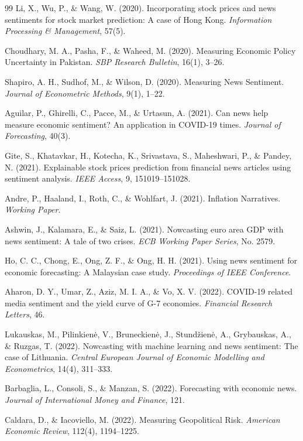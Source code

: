 \documentclass[11pt,twocolumn]{article}
\begin{document}
\begin{thebibliography}{99}
 Li, X., Wu, P., \& Wang, W. (2020). Incorporating stock prices and news sentiments for stock market prediction: A case of Hong Kong. \textit{Information Processing \& Management}, 57(5).

 Choudhary, M. A., Pasha, F., \& Waheed, M. (2020). Measuring Economic Policy Uncertainty in Pakistan. \textit{SBP Research Bulletin}, 16(1), 3--26.

 Shapiro, A. H., Sudhof, M., \& Wilson, D. (2020). Measuring News Sentiment. \textit{Journal of Econometric Methods}, 9(1), 1--22.

 Aguilar, P., Ghirelli, C., Pacce, M., \& Urtasun, A. (2021). Can news help measure economic sentiment? An application in COVID-19 times. \textit{Journal of Forecasting}, 40(3).

 Gite, S., Khatavkar, H., Kotecha, K., Srivastava, S., Maheshwari, P., \& Pandey, N. (2021). Explainable stock prices prediction from financial news articles using sentiment analysis. \textit{IEEE Access}, 9, 151019--151028.

 Andre, P., Haaland, I., Roth, C., \& Wohlfart, J. (2021). Inflation Narratives. \textit{Working Paper}.

 Ashwin, J., Kalamara, E., \& Saiz, L. (2021). Nowcasting euro area GDP with news sentiment: A tale of two crises. \textit{ECB Working Paper Series}, No. 2579.

 Ho, C. C., Chong, E., Ong, Z. F., \& Ong, H. H. (2021). Using news sentiment for economic forecasting: A Malaysian case study. \textit{Proceedings of IEEE Conference}.

 Aharon, D. Y., Umar, Z., Aziz, M. I. A., \& Vo, X. V. (2022). COVID-19 related media sentiment and the yield curve of G-7 economies. \textit{Financial Research Letters}, 46.

 Lukauskas, M., Pilinkienė, V., Bruneckienė, J., Stundžienė, A., Grybauskas, A., \& Ruzgas, T. (2022). Nowcasting with machine learning and news sentiment: The case of Lithuania. \textit{Central European Journal of Economic Modelling and Econometrics}, 14(4), 311--333.

 Barbaglia, L., Consoli, S., \& Manzan, S. (2022). Forecasting with economic news. \textit{Journal of International Money and Finance}, 121.

 Caldara, D., \& Iacoviello, M. (2022). Measuring Geopolitical Risk. \textit{American Economic Review}, 112(4), 1194--1225.


\end{thebibliography}
\end{document}
